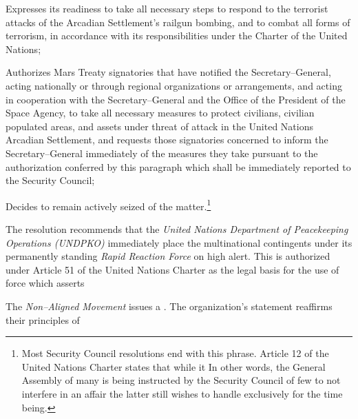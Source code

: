 \item Expresses its readiness to take all necessary steps to respond to the terrorist attacks of the Arcadian Settlement's railgun bombing, and to combat all forms of terrorism, in accordance with its responsibilities under the Charter of the United Nations;

\item Authorizes Mars Treaty signatories that have notified the Secretary--General, acting nationally or through regional organizations or arrangements, and acting in cooperation with the Secretary--General and the Office of the President of the Space Agency, to take all necessary measures to protect civilians, civilian populated areas, and assets under threat of attack in the United Nations Arcadian Settlement, and requests those signatories concerned to inform the Secretary--General immediately of the measures they take pursuant to the authorization conferred by this paragraph which shall be immediately reported to the Security Council;

\item Decides to remain actively seized of the matter.\footnote{Most Security Council resolutions end with this phrase. Article 12 of the United Nations Charter states that while it  In other words, the General Assembly of many is being instructed by the Security Council of few to not interfere in an affair the latter still wishes to handle exclusively for the time being.}
\stopitemize
\stopTimelineGeneralDocument

The resolution recommends that the {\it United Nations Department of Peacekeeping Operations (UNDPKO)} immediately place the multinational contingents under its permanently standing {\it Rapid Reaction Force} on high alert. This is authorized under Article 51 of the United Nations Charter as the legal basis for the use of force which asserts 
\StopTimelineDate

The {\it Non--Aligned Movement} issues a . The organization's statement reaffirms their principles of 

